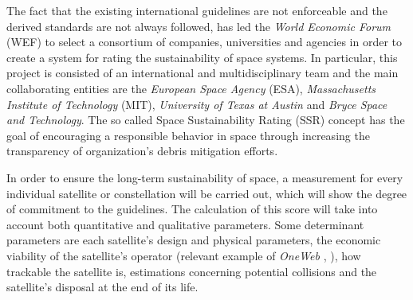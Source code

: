 \bigskip
The fact that the existing international guidelines are not enforceable and the derived standards are not always followed, has led the \textit{World Economic Forum} (WEF) to select a consortium of companies, universities and agencies in order to create a system for rating the sustainability of space systems. \cite{Space sustainability} %
In particular, this project is consisted of an international and multidisciplinary team and the main collaborating entities are the \textit{European Space Agency} (ESA), \textit{Massachusetts Institute of Technology} (MIT), \textit{University of Texas at Austin} and \textit{Bryce Space and Technology}. The so called Space Sustainability Rating (SSR) concept has the goal of encouraging a responsible behavior in space through increasing the transparency of organization's debris mitigation efforts.

In order to ensure the long-term sustainability of space, a measurement for every individual satellite or constellation will be carried out, which will show the degree of commitment to the guidelines. The calculation of this score will take into account both quantitative and qualitative parameters. Some determinant parameters are each satellite's design and physical parameters, the economic viability of the satellite's operator (relevant example of \textit{OneWeb} \cite{Oneweb_bankruptcy}, \cite{Cadman}), %
how trackable the satellite is, estimations concerning potential collisions and the satellite's disposal at the end of its life. \cite{Space sustainability}

